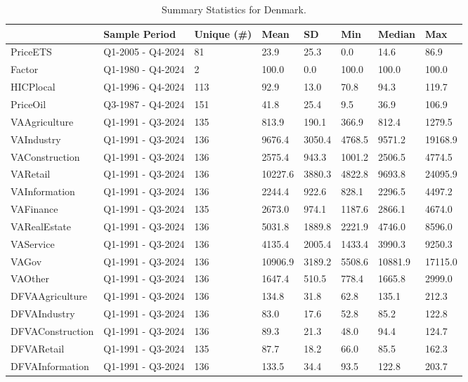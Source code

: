 \begingroup\fontsize{7}{9}\selectfont

\begin{longtable}[t]{llllllll}
\caption{Summary Statistics for Denmark.}\\
\toprule
  & Sample Period & Unique (\#) & Mean & SD & Min & Median & Max\\
\midrule
PriceETS & Q1-2005 - Q4-2024 & 81 & 23.9 & 25.3 & 0.0 & 14.6 & 86.9\\
Factor & Q1-1980 - Q4-2024 & 2 & 100.0 & 0.0 & 100.0 & 100.0 & 100.0\\
HICPlocal & Q1-1996 - Q4-2024 & 113 & 92.9 & 13.0 & 70.8 & 94.3 & 119.7\\
PriceOil & Q3-1987 - Q4-2024 & 151 & 41.8 & 25.4 & 9.5 & 36.9 & 106.9\\
VAAgriculture & Q1-1991 - Q3-2024 & 135 & 813.9 & 190.1 & 366.9 & 812.4 & 1279.5\\
\addlinespace
VAIndustry & Q1-1991 - Q3-2024 & 136 & 9676.4 & 3050.4 & 4768.5 & 9571.2 & 19168.9\\
VAConstruction & Q1-1991 - Q3-2024 & 136 & 2575.4 & 943.3 & 1001.2 & 2506.5 & 4774.5\\
VARetail & Q1-1991 - Q3-2024 & 136 & 10227.6 & 3880.3 & 4822.8 & 9693.8 & 24095.9\\
VAInformation & Q1-1991 - Q3-2024 & 136 & 2244.4 & 922.6 & 828.1 & 2296.5 & 4497.2\\
VAFinance & Q1-1991 - Q3-2024 & 135 & 2673.0 & 974.1 & 1187.6 & 2866.1 & 4674.0\\
\addlinespace
VARealEstate & Q1-1991 - Q3-2024 & 136 & 5031.8 & 1889.8 & 2221.9 & 4746.0 & 8596.0\\
VAService & Q1-1991 - Q3-2024 & 136 & 4135.4 & 2005.4 & 1433.4 & 3990.3 & 9250.3\\
VAGov & Q1-1991 - Q3-2024 & 136 & 10906.9 & 3189.2 & 5508.6 & 10881.9 & 17115.0\\
VAOther & Q1-1991 - Q3-2024 & 136 & 1647.4 & 510.5 & 778.4 & 1665.8 & 2999.0\\
DFVAAgriculture & Q1-1991 - Q3-2024 & 136 & 134.8 & 31.8 & 62.8 & 135.1 & 212.3\\
\addlinespace
DFVAIndustry & Q1-1991 - Q3-2024 & 136 & 83.0 & 17.6 & 52.8 & 85.2 & 122.8\\
DFVAConstruction & Q1-1991 - Q3-2024 & 136 & 89.3 & 21.3 & 48.0 & 94.4 & 124.7\\
DFVARetail & Q1-1991 - Q3-2024 & 135 & 87.7 & 18.2 & 66.0 & 85.5 & 162.3\\
DFVAInformation & Q1-1991 - Q3-2024 & 136 & 133.5 & 34.4 & 93.5 & 122.8 & 203.7\\

\end{longtable}
